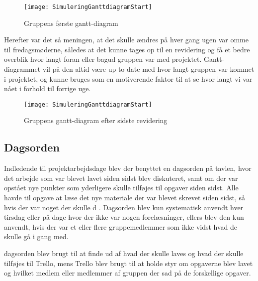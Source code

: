 \begin{figure}[h]
\texttt{[image: SimuleringGanttdiagramStart]}
\centering
\caption{Gruppens første gantt-diagram}\label{Gantt-diagram-picture}
\end{figure}

Herefter var det så meningen, at det skulle ændres på hver gang ugen var omme til fredagsmøderne, således at det kunne tages op til en revidering og få et bedre overblik hvor langt foran eller bagud gruppen var med projektet. Gantt-diagrammet vil på den altid være up-to-date med hvor langt gruppen var kommet i projektet, og kunne bruges som en motiverende faktor til at se hvor langt vi var nået i forhold til forrige uge.

\begin{figure}[h]
\texttt{[image: SimuleringGanttdiagramStart]}
\centering
\caption{Gruppens gantt-diagram efter sidste revidering}\label{Gantt-diagram-picture}
\end{figure}

\subsection{Dagsorden}\label{Dagsorden}
Indledende til projektarbejdsdage blev der benyttet en dagsorden på tavlen, hvor det arbejde som var blevet lavet siden sidst blev diskuteret, samt om der var opstået nye punkter som yderligere skulle tilføjes til opgaver siden sidst. Alle havde til opgave at læse det nye materiale der var blevet skrevet siden sidst, så hvis der var noget der skulle d . Dagsorden blev kun systematisk anvendt hver tirsdag eller på dage hvor der ikke var nogen forelæsninger, ellers blev den kun anvendt, hvis der var et eller flere gruppemedlemmer som ikke vidst hvad de skulle gå i gang med. 

dagsorden blev brugt til at finde ud af hvad der skulle laves og hvad der skulle tilføjes til Trello, mens Trello blev brugt til at holde styr om opgaverne blev lavet og hvilket medlem eller medlemmer af gruppen der sad på de forskellige opgaver.



